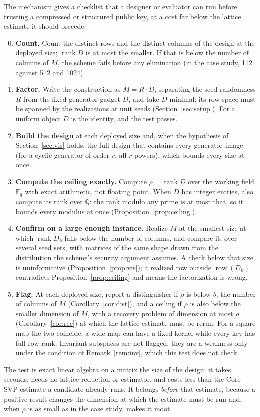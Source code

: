 \documentclass[11pt]{article}
\makeatletter
\theoremstyle{remark}
\newcommand{\F}{\mathbb{F}}
\DeclareMathOperator{\rank}{rank}
\DeclareMathOperator{\row}{row}
\DeclareRobustCommand{\_}{%
  \edef\@tempa{\ttdefault}%
  \ifx\f@family\@tempa\char95 \else\textunderscore\fi\penalty300\relax}
\makeatother
\begin{document}
The mechanism gives a checklist that a designer or evaluator can run before trusting a compressed or structured public
key, at a cost far below the lattice estimate it should precede.
\begin{enumerate}\setcounter{enumi}{-1}
\item \textbf{Count.} Count the distinct rows and the distinct columns of the design at the deployed size; $\rank D$ is
  at most the smaller. If that is below the number of columns of $M$, the scheme fails before any elimination (in the
  case study, 112 against 512 and 1024).
\item \textbf{Factor.} Write the construction as $M=R\cdot D$, separating the seed randomness $R$ from the fixed
  generator gadget $D$, and take $D$ minimal: its row space must be spanned by the realizations at unit seeds
  (Section~\ref{sec:setup}). For a uniform object $D$ is the identity, and the test passes.
\item \textbf{Build the design} at each deployed size and, when the hypothesis of Section~\ref{sec:vis} holds, the full
  design that contains every generator image (for a cyclic generator of order $r$, all $r$ powers), which bounds every
  size at once.
\item \textbf{Compute the ceiling exactly.} Compute $\rho=\rank D$ over the working field $\F_q$ with exact arithmetic,
  not floating point. When $D$ has integer entries, also compute its rank over $\mathbb{Q}$: the rank modulo any prime
  is at most that, so it bounds every modulus at once (Proposition~\ref{prop:ceiling}).
\item \textbf{Confirm on a large enough instance.} Realize $M$ at the smallest size at which $\rank D_k$ falls below the
  number of columns, and compare it, over several seed sets, with matrices of the same shape drawn from the distribution
  the scheme's security argument assumes. A check below that size is uninformative (Proposition~\ref{prop:vis}); a
  realized row outside $\row(D_k)$ contradicts Proposition~\ref{prop:ceiling} and means the factorization is wrong.
\item \textbf{Flag.} At each deployed size, report a distinguisher if $\rho$ is below $b$, the number of columns of $M$
  (Corollary~\ref{cor:dist}), and a ceiling if $\rho$ is also below the smaller dimension of $M$, with a recovery problem
  of dimension at most $\rho$ (Corollary~\ref{cor:rec}) at which the lattice estimate must be rerun. For a square map the
  two coincide; a wide map can have a fixed kernel while every key has full row rank. Invariant subspaces are not
  flagged: they are a weakness only under the condition of Remark~\ref{rem:inv}, which this test does not check.
\end{enumerate}
The test is exact linear algebra on a matrix the size of the design: it takes seconds, needs no lattice reduction or
estimator, and costs less than the Core-SVP estimate a candidate already runs. It belongs \emph{before} that estimate,
because a positive result changes the dimension at which the estimate must be run and, when $\rho$ is as small as in the
case study, makes it moot.
\end{document}
